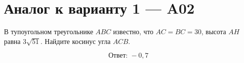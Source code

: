 \documentclass[12pt,a4paper]{article}
\begin{document}
\section*{Аналог к варианту 1 — A02}
В тупоугольном треугольнике \(ABC\) известно, что \(AC=BC=30\), высота \(AH\) равна \(3\sqrt{51}\). Найдите косинус угла \(ACB\).
\begin{center}\figIsoscelesObtuse\end{center}
\[\boxed{\text{Ответ: }-0{,}7}\]
\end{document}
